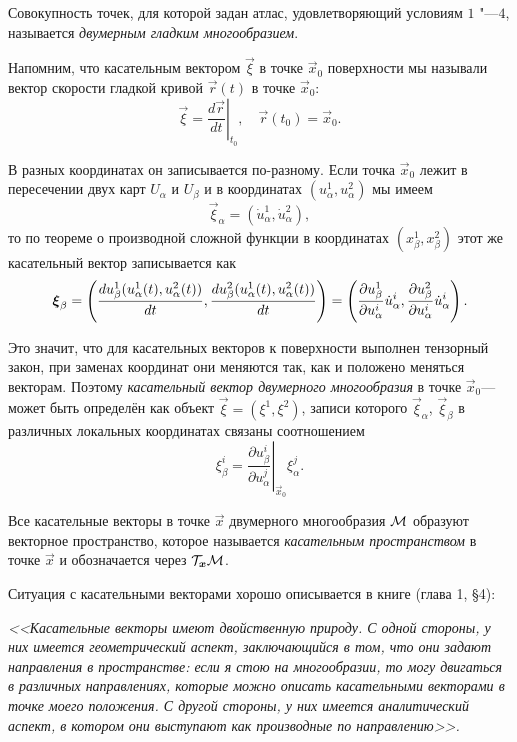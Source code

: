 \begin{definition}
	Совокупность точек, для которой задан атлас, удовлетворяющий условиям $1$ "---$4$, называется \textit{двумерным гладким многообразием}.
\end{definition}

Напомним, что касательным вектором $\vec{\xi}$ в точке $\vec{x}_0$ поверхности мы называли вектор скорости гладкой кривой $\vec{r}(t)$ в точке $\vec{x}_0$:
\[
	\vec{\xi} = \left.\frac{d\vec{r}}{dt}\right|_{t_0},\quad \vec{r}(t_0) = \vec{x}_0.
\]

В разных координатах он записывается по-разному. Если точка $\vec{x}_0$ лежит в пересечении двух карт $U_\alpha$ и $U_\beta$ и в координатах $(u_\alpha^1, u_\alpha^2)$ мы имеем
\[
	\vec{\xi}_\alpha = (\dot{u}^1_\alpha, \dot{u}^2_\alpha),
\]
то по теореме о производной сложной функции в координатах $(x_\beta^1, x_\beta^2)$ этот же касательный вектор записывается как
\[
	\boldsymbol{\xi}_\beta = \left(\frac{du_\beta^1(u_\alpha^1(t), u_\alpha^2(t))}{dt}, \frac{du_\beta^2(u_\alpha^1(t), u_\alpha^2(t))}{dt}\right) = \left(\frac{\partial u_\beta^1}{\partial u^i_\alpha}\dot{u}_\alpha^i, \frac{\partial u_\beta^2}{\partial u^i_\alpha}\dot{u}_\alpha^i\right).
\]

Это значит, что для касательных векторов к поверхности выполнен тензорный закон, при заменах координат они меняются так, как и положено меняться векторам. Поэтому \textit{касательный вектор двумерного многообразия} в точке $\vec{x}_0$---  может быть определён как объект $\vec{\xi} = (\xi^1, \xi^2)$, записи которого $\vec{\xi}_\alpha$, $\vec{\xi}_\beta$ в различных локальных координатах связаны соотношением
\[
	\xi_\beta^i = \left.\frac{\partial u_\beta^i}{\partial u_\alpha^j}\right|_{\vec{x}_0}\xi^j_\alpha.
\]

\begin{definition}
	Все касательные векторы в точке $\vec{x}$ двумерного многообразия $\mathcal{M}$ образуют векторное пространство, которое называется \textit{касательным пространством} в точке $\vec{x}$ и обозначается через $\mathcal{T}_{\boldsymbol{x}}\mathcal{M}$.
\end{definition}

\noindent
Ситуация с касательными векторами хорошо описывается в книге \cite{S19} (глава 1, \S 4):

\begin{center}
	\textit{<<Касательные векторы имеют двойственную природу. С одной стороны, у них имеется геометрический аспект, заключающийся в том, что они задают направления в пространстве: если я стою на многообразии, то могу двигаться в различных направлениях, которые можно описать касательными векторами в точке моего положения. С другой стороны, у них имеется аналитический аспект, в котором они выступают как \glqq производные по направлению\grqq>>.}
\end{center}

